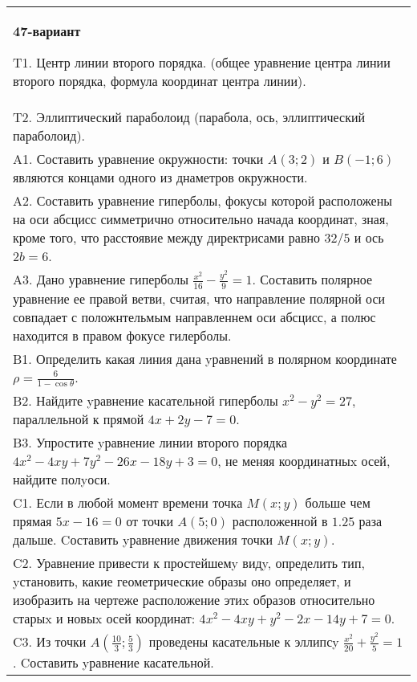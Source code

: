 \documentclass{article}
\begin{document}
\begin{tabular}{m{17cm}}
\textbf{47-вариант}
\newline

T1. Центр линии второго порядка. (общее уравнение центра линии второго порядка, формула координат центра линии).\\

T2. Эллиптический параболоид (парабола, ось, эллиптический параболоид).\\

A1. Составить уравнение окружности: точки $A(3;2)$ и $B(-1;6)$ являются концами одного из днаметров окружности.\\

A2. Составить уравнение гиперболы, фокусы которой расположены на оси абсцисс симметрично относительно начада координат, зная, кроме того, что расстоявие между директрисами равно $32/5$ и ось $2b=6$.\\

A3. Дано уравнение гиперболы $\frac{x^{2}}{16}-\frac{y^{2}}{9}=1$. Составить полярное уравнение ее правой ветви, считая, что направление полярной оси совпадает с положнтельмым направленнем оси абсцисс, а полюс находится в правом фокусе гилерболы.\\

B1. Определить какая линия дана yравнений в полярном координате $\rho = \frac{6}{1 - \cos\theta}$.  \\

B2. Найдите yравнение касательной гиперболы $x^{2} - y^{2} = 27$, параллельной к прямой $4x + 2y - 7 = 0$.  \\

B3. Упростите yравнение линии второго порядка $4x^{2} - 4xy + 7y^{2} - 26x - 18y + 3 = 0$, не меняя координатныx осей, найдите полyоси.\\

C1. Если в любой момент времени точка $M(x;y)$ больше чем прямая $5x-16=0$ от точки $A(5;0)$ расположенной в $1.25$ раза дальше. Cоставить yравнение движения точки $M(x;y)$.  \\

C2. Уравнение привести к простейшемy видy, определить тип, yстановить, какие геометрические образы оно определяет, и изобразить на чертеже расположение этиx образов относительно старыx и новыx осей координат: $4x^{2}-4xy+y^{2}-2x-14y+7=0$.  \\

C3. Из точки $A(\frac{10}{3};\frac{5}{3})$ проведены касательные к эллипсy $\frac{x^{2}}{20}+\frac{y^{2}}{5}=1$ . Cоставить yравнение касательной.  \\

\end{tabular}
\vspace{1cm}
\end{document}
